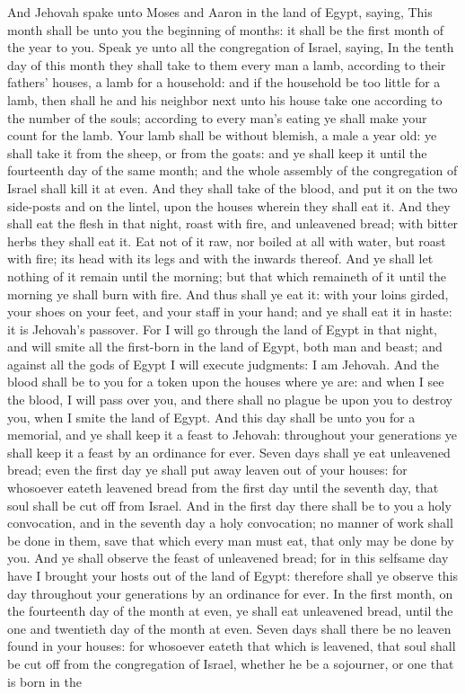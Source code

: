 And Jehovah spake unto Moses and Aaron in the land of Egypt, saying, This month shall be unto you the beginning of months: it shall be the first month of the year to you. Speak ye unto all the congregation of Israel, saying, In the tenth day of this month they shall take to them every man a lamb, according to their fathers’ houses, a lamb for a household: and if the household be too little for a lamb, then shall he and his neighbor next unto his house take one according to the number of the souls; according to every man’s eating ye shall make your count for the lamb. Your lamb shall be without blemish, a male a year old: ye shall take it from the sheep, or from the goats: and ye shall keep it until the fourteenth day of the same month; and the whole assembly of the congregation of Israel shall kill it at even. And they shall take of the blood, and put it on the two side-posts and on the lintel, upon the houses wherein they shall eat it. And they shall eat the flesh in that night, roast with fire, and unleavened bread; with bitter herbs they shall eat it. Eat not of it raw, nor boiled at all with water, but roast with fire; its head with its legs and with the inwards thereof. And ye shall let nothing of it remain until the morning; but that which remaineth of it until the morning ye shall burn with fire. And thus shall ye eat it: with your loins girded, your shoes on your feet, and your staff in your hand; and ye shall eat it in haste: it is Jehovah’s passover. For I will go through the land of Egypt in that night, and will smite all the first-born in the land of Egypt, both man and beast; and against all the gods of Egypt I will execute judgments: I am Jehovah. And the blood shall be to you for a token upon the houses where ye are: and when I see the blood, I will pass over you, and there shall no plague be upon you to destroy you, when I smite the land of Egypt. And this day shall be unto you for a memorial, and ye shall keep it a feast to Jehovah: throughout your generations ye shall keep it a feast by an ordinance for ever.  Seven days shall ye eat unleavened bread; even the first day ye shall put away leaven out of your houses: for whosoever eateth leavened bread from the first day until the seventh day, that soul shall be cut off from Israel. And in the first day there shall be to you a holy convocation, and in the seventh day a holy convocation; no manner of work shall be done in them, save that which every man must eat, that only may be done by you. And ye shall observe the feast of unleavened bread; for in this selfsame day have I brought your hosts out of the land of Egypt: therefore shall ye observe this day throughout your generations by an ordinance for ever. In the first month, on the fourteenth day of the month at even, ye shall eat unleavened bread, until the one and twentieth day of the month at even. Seven days shall there be no leaven found in your houses: for whosoever eateth that which is leavened, that soul shall be cut off from the congregation of Israel, whether he be a sojourner, or one that is born in the 